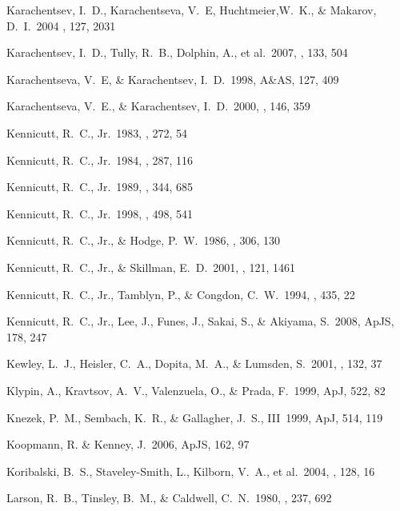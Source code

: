 \documentclass[12pt,onecolumn]{emulateapj}
\begin{document}
\begin{thebibliography}{}
Karachentsev, I.~D., Karachentseva, V.~E, Huchtmeier,W.~K., \& Makarov, D.~I.\ 2004 \aj, 127, 2031 

Karachentsev, I.~D., Tully, R.~B., Dolphin, A., et al.\ 2007, \aj, 133, 504 

Karachentseva, V.~E, \& Karachentsev, I.~D.\ 1998, A\&AS, 127, 409 

Karachentseva, V.~E., \& Karachentsev, I.~D.\ 2000, \aaps, 146, 359 

Kennicutt, R.~C., Jr.\ 1983, \apj , 272, 54

Kennicutt, R.~C., Jr.\ 1984, \apj , 287, 116

Kennicutt, R.~C., Jr.\ 1989, \apj, 344, 685 

Kennicutt, R.~C., Jr.\ 1998, \apj , 498, 541

Kennicutt, R.~C., Jr., \& Hodge, P.~W.\ 1986, \apj , 306, 130

Kennicutt, R.~C., Jr., \& Skillman, E.~D.\ 2001, \aj , 121, 1461 

Kennicutt, R.~C., Jr., Tamblyn, P., \& Congdon, C.~W.\ 1994, \apj , 435, 22

Kennicutt, R.~C., Jr., Lee, J., Funes, J., Sakai, S., \& Akiyama, S.\ 2008, ApJS, 178, 247

Kewley, L.~J., Heisler, C.~A., Dopita, M.~A., \& Lumsden, S.\ 2001, \apjs, 132, 37 

Klypin, A., Kravtsov, A.~V., Valenzuela, O., \& Prada, F.\ 1999, ApJ, 522, 82

Knezek, P.~M., Sembach, K.~R., \& Gallagher, J.~S., III\ 1999, ApJ, 514, 119

Koopmann, R. \& Kenney, J.\ 2006, ApJS, 162, 97

Koribalski, B.~S., Staveley-Smith, L., Kilborn, V.~A., et al.\ 2004, \aj, 128, 16

Larson, R.~B., Tinsley, B.~M., \& Caldwell, C.~N.\ 1980, \apj, 237, 692 


\end{thebibliography}
\end{document}
